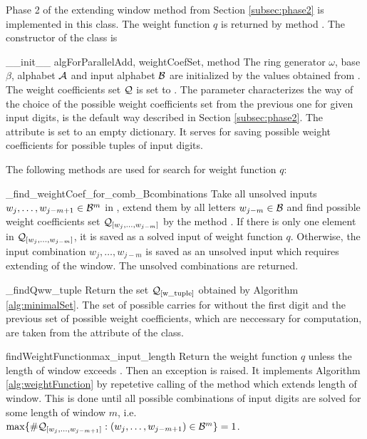 Phase 2 of the extending window method from Section \ref{subsec:phase2} is implemented in this class. The weight function $q$ is returned by method . The constructor of the class is

\begin{method}{\_\_init\_\_}{ algForParallelAdd, weightCoefSet, method}
The ring generator $\omega$, base $\beta$, alphabet $\mathcal{A}$ and input alphabet $\mathcal{B}$ are initialized by the values obtained from . The weight coefficients set $\mathcal{Q}$ is set to . The parameter  characterizes the way of the choice of the possible weight coefficients set from the previous one for given input digits,  is the default way described in Section \ref{subsec:phase2}. The attribute  is set to an empty dictionary. It serves for saving possible weight coefficients for possible tuples of input digits.
\end{method}

The following methods are used for search for weight function $q$:

\begin{method}{\_find\_weightCoef\_for\_comb\_B}{combinations}
Take all unsolved inputs $w_j,\dots, w_{j-m+1} \in \mathcal{B}^m$ in , extend them by all letters $w_{j-m}\in\mathcal{B}$ and find possible weight coefficients set $\mathcal{Q}_{[w_j,\dots, w_{j-m}]}$ by the method . If there is only one element in $\mathcal{Q}_{[w_j,\dots, w_{j-m}]}$, it is saved as a solved input of weight function $q$. Otherwise, the input combination $w_j,\dots, w_{j-m}$ is saved as an unsolved input which requires extending of the window. The unsolved combinations are returned.  
\end{method}


\begin{method}{\_findQw}{w\_tuple}
Return the set $\mathcal{Q}_{[\text{w\_tuple}]}$ obtained by Algorithm \ref{alg:minimalSet}. The set of possible carries for  without the first digit and the previous set of possible weight coefficients, which are neccessary for computation, are taken from the attribute  of the class.
\end{method}


\begin{method}{findWeightFunction}{max\_input\_length}
Return the weight function $q$ unless the length of window exceeds . Then an exception is raised. It implements Algorithm \ref{alg:weightFunction} by repetetive calling of the method  which extends length of window. This is done until all possible combinations of input digits are solved for some length of window $m$, i.e. $\max\{\#\mathcal{Q}_{[w_j,\dots, w_{j-m+1}]}:(w_j,\dots, w_{j-m+1}) \in \mathcal{B}^m \} = 1$.
\end{method}


